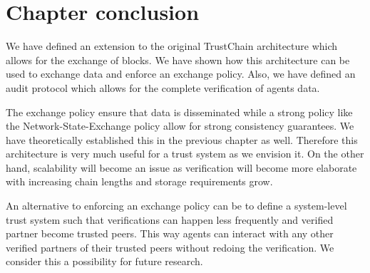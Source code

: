 


\section{Chapter conclusion}
We have defined an extension to the original TrustChain architecture which allows for the exchange 
of blocks. We have shown how this architecture can be used to exchange data and enforce an 
exchange policy. Also, we have defined an audit protocol which allows for the complete verification
of agents data. 

The exchange policy ensure that data is disseminated while a strong policy like the Network-State-Exchange
policy allow for strong consistency guarantees. We have theoretically established this in the 
previous chapter as well. Therefore this architecture is very much useful for a trust system as we
envision it. On the other hand, scalability will become an issue as verification will become more
elaborate with increasing chain lengths and storage requirements grow. 

An alternative to enforcing an exchange policy can be to define a system-level trust system such that
verifications can happen less frequently and verified partner become trusted peers. This way agents
can interact with any other verified partners of their trusted peers without redoing the verification.
We consider this a possibility for future research.